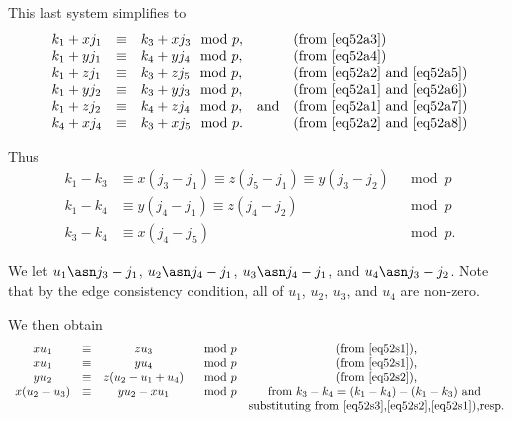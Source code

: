 This last system simplifies to
\begin{equation}\label{eq52b}\begin{array}{llllll}
k_1+xj_1 &\equiv& k_3+xj_3 \mod p,& {}&\text{(from \eqref{eq52a3})}\\
k_1+yj_1 &\equiv& k_4+yj_4 \mod p,& {}&\text{(from \eqref{eq52a4})}\\
k_1+zj_1 &\equiv& k_3+zj_5 \mod p,& {}&\text{(from \eqref{eq52a2} and \eqref{eq52a5})}\\
k_1+yj_2 &\equiv& k_3+yj_3 \mod p,& {}&\text{(from \eqref{eq52a1} and \eqref{eq52a6})}\\
k_1+zj_2 &\equiv& k_4+zj_4 \mod p, &\text{and}&\text{(from \eqref{eq52a1} and \eqref{eq52a7})}\\
k_4+xj_4 &\equiv& k_3+xj_5 \mod p.&{}&\text{(from \eqref{eq52a2} and
\eqref{eq52a8})}
\end{array}\end{equation}

Thus
\begin{subequations}\begin{eqnarray}
\label{eq52s1}k_1-k_3 &\equiv x(j_3-j_1) \equiv z(j_5-j_1) \equiv
y(j_3-j_2) &
\mod p\\
\label{eq52s2}k_1-k_4 &\equiv y(j_4-j_1) \equiv z(j_4-j_2) &
\mod p\\
\label{eq52s3}k_3-k_4 &\equiv x(j_4-j_5) &\mod p.
\end{eqnarray}\end{subequations}

 We let $u_1 \asn j_3 -j_1$, $u_2\asn j_4 -j_1$, $u_3 \asn j_4
-j_1$, and $u_4 \asn j_3 -j_2$. Note that by the edge consistency
condition, all of $u_1$, $u_2$, $u_3$, and $u_4$ are non-zero.

We then obtain
\begin{equation}\begin{array}{cccccc}
xu_1 &\equiv& zu_3 & \mod p & \text{(from \eqref{eq52s1}),} \\xu_1
&\equiv& yu_4 & \mod p & \text{(from \eqref{eq52s1}),}\\
yu_2 &\equiv& z(u_2-u_1+u_4)& \mod p & \text{(from \eqref{eq52s2}),}
\\x(u_2-u_3)
&\equiv& yu_2-xu_1 & \mod p & \text{from
$k_3-k_4=(k_1-k_4)-(k_1-k_3)$ and }\\{}&{}&{}&{}& \text{substituting
from \eqref{eq52s3},\eqref{eq52s2},\eqref{eq52s1}),resp.}
\end{array}\end{equation}

